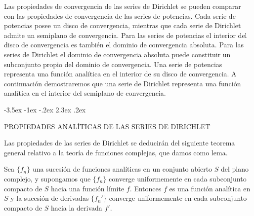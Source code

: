 \documentclass[12pt,a4paper]{book}
\makeatletter
\renewcommand\section{\@startsection{section}{1}{\z@}%
  {-3.5ex \@plus -1ex \@minus -.2ex}%
  {2.3ex \@plus .2ex}%
  {\normalfont\Large\bfseries\raggedright}}
\makeatother
\begin{document}
    Las propiedades de convergencia de las series de Dirichlet se pueden comparar con las
    propiedades de convergencia de las series de potencias. Cada serie de potencias posee un
    disco de convergencia, mientras que cada serie de Dirichlet admite un semiplano de
    convergencia. Para las series de potencias el interior del disco de convergencia es
    también el dominio de convergencia absoluta. Para las series de Dirichlet el dominio de
    convergencia absoluta puede constituir un subconjunto propio del dominio de convergencia.
    Una serie de potencias representa una función analítica en el interior de su disco de
    convergencia. A continuación demostraremos que una serie de Dirichlet representa una
    función analítica en el interior del semiplano de convergencia.

    \section{PROPIEDADES ANALÍTICAS DE LAS SERIES DE DIRICHLET}

    Las propiedades de las series de Dirichlet se deducirán del siguiente teorema general
    relativo a la teoría de funciones complejas, que damos como lema.

    \begin{lema}\label{lem:11-3}
        Sea $\{f_{n}\}$ una sucesión de funciones analíticas en un conjunto abierto $S$ del
        plano complejo, y supongamos que $\{f_{n}\}$ converge uniformemente en cada subconjunto
        compacto de $S$ hacia una función límite $f$. Entonces $f$ es una función analítica en
        $S$ y la sucesión de derivadas $\{f_{n}'\}$ converge uniformemente en cada subconjunto
        compacto de $S$ hacia la derivada $f'$.
    \end{lema}
\end{document}
